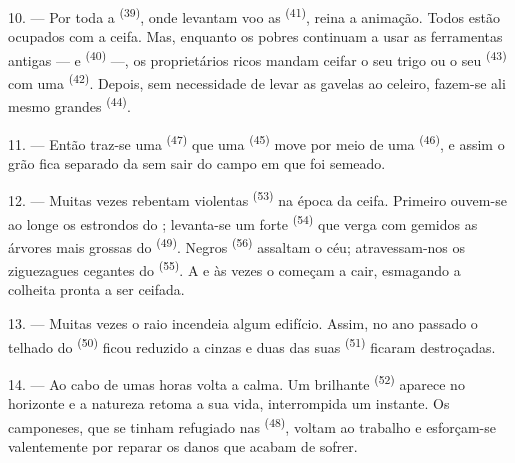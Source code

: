 10. --- Por toda a  \textsuperscript{(39)}, onde levantam voo as
 \textsuperscript{(41)}, reina a animação. Todos estão ocupados
com a ceifa. Mas, enquanto os pobres continuam a usar as ferramentas
antigas ---  e 
\textsuperscript{(40)} ---, os proprietários ricos mandam ceifar o seu trigo ou
o seu  \textsuperscript{(43)} com uma 
\textsuperscript{(42)}. Depois, sem necessidade de levar as gavelas ao celeiro,
fazem-se ali mesmo grandes  \textsuperscript{(44)}.

11. --- Então traz-se uma  \textsuperscript{(47)} que uma
 \textsuperscript{(45)} move por meio de uma  \textsuperscript{(46)}, e assim o grão fica separado da
 sem sair do campo em que foi semeado.

\VUsaut{5.0mm}
\VUsaut{3.4mm}

12. --- Muitas vezes rebentam violentas 
\textsuperscript{(53)} na época da ceifa. Primeiro ouvem-se ao longe os
estrondos do ; levanta-se um forte 
\textsuperscript{(54)} que verga com gemidos as árvores mais grossas do
 \textsuperscript{(49)}. Negros 
\textsuperscript{(56)} assaltam o céu; atravessam-nos os ziguezagues cegantes do
 \textsuperscript{(55)}. A  e às vezes o
 começam a cair, esmagando a colheita pronta a ser
ceifada.

13. --- Muitas vezes o raio incendeia algum edifício. Assim, no ano
passado o telhado do  \textsuperscript{(50)} ficou
reduzido a cinzas e duas das suas  \textsuperscript{(51)} ficaram
destroçadas.

14. --- Ao cabo de umas horas volta a calma. Um brilhante 
\textsuperscript{(52)} aparece no horizonte e a natureza retoma a sua vida,
interrompida um instante. Os camponeses, que se tinham refugiado nas
 \textsuperscript{(48)}, voltam ao trabalho e esforçam-se
valentemente por reparar os danos que acabam de sofrer.

\VUsaut{6.0mm}
\VUsaut{3.6mm}

\VUsaut{1.4mm}
\VUsaut{4.0mm}

